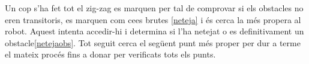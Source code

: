 Un cop s'ha fet tot el zig-zag es marquen per tal de comprovar si els obstacles
no eren transitoris, es marquen com ce\lgem es brutes \ref{neteja} i és cerca la
més propera al robot. Aquest intenta accedir-hi i determina si l'ha netejat o
es definitivament un obstacle\ref{netejaobs}. Tot seguit cerca el següent punt
més proper per dur a terme el mateix procés fins a donar per verificats tots els
punts.

 